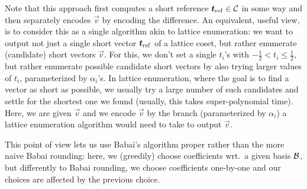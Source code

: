 \begin{remark}
Note that this approach first computes a short reference $\boldsymbol{t}_{\mathrm{ref}}\in\mathcal{C}$ in some way and then separately encodes $\vec{v}$ by encoding the difference.
An equivalent, useful view, is to consider this as a single algorithm akin to lattice enumeration: we want to output not just a single short vector $\boldsymbol{t}_{\mathrm{ref}}$ of a lattice coset, but rather enumerate (candidate) short vectors $\vec{v}$. For this, we don't set a single $t_i$'s with $-\tfrac12 < t_i \leq \tfrac12$, but rather enumerate possible candidate short vectors by also trying larger values of $t_i$, parameterized by $\alpha_i$'s. In lattice enumeration, where the goal is to find a vector as short as possible, we usually try a large number of such candidates and settle for the shortest one we found (usually, this takes super-polynomial time). Here, we are given $\vec{v}$ and we encode $\vec{v}$ by the branch (parameterized by $\alpha_i$) a lattice enumeration algorithm would need to take to output $\vec{v}$.

This point of view lets us use Babai's algorithm proper rather than the more naive Babai rounding: here, we (greedily) choose coefficients wrt.\ a given basis $\mathcal{B}$, but differently to Babai rounding, we choose coefficients one-by-one and
our choices are affected by the previous choice.


\end{remark}
